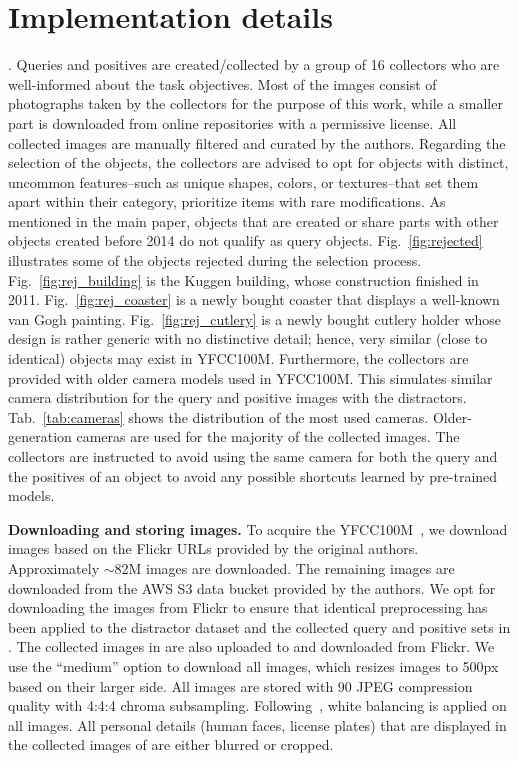 \appendix
\renewcommand{\thefigure}{\Alph{figure}}
\renewcommand{\thetable}{\Alph{table}}

\section{Implementation details}

\medskip{}. 
Queries and positives are created/collected by a group of 16 collectors who are well-informed about the task objectives. 
Most of the images consist of photographs taken by the collectors for the purpose of this work, while a smaller part is downloaded from online repositories with a permissive license.
All collected images are manually filtered and curated by the authors. Regarding the selection of the objects, the collectors are advised to opt for objects with distinct, uncommon features--such as unique shapes, colors, or textures--that set them apart within their category, \ie prioritize items with rare modifications. 
As mentioned in the main paper, objects that are created or share parts with other objects created before 2014 do not qualify as query objects. Fig.~\ref{fig:rejected} illustrates some of the objects rejected during the selection process. Fig.~\ref{fig:rej_building} is the Kuggen building, whose construction finished in 2011. Fig.~\ref{fig:rej_coaster} is a newly bought coaster that displays a well-known van Gogh painting. Fig.~\ref{fig:rej_cutlery} is a newly bought cutlery holder whose design is rather generic with no distinctive detail; hence, very similar (close to identical) objects may exist in YFCC100M. 
Furthermore, the collectors are provided with older camera models used in YFCC100M. This simulates similar camera distribution for the query and positive images with the distractors. Tab.~\ref{tab:cameras} shows the distribution of the most used cameras. Older-generation cameras are used for the majority of the collected images.
The collectors are instructed to avoid using the same camera for both the query and the positives of an object to avoid any possible shortcuts learned by pre-trained models.

\medskip\noindent\textbf{Downloading and storing images.}
To acquire the YFCC100M~\cite{tsf+16}, we download images based on the Flickr URLs provided by the original authors.
Approximately $\sim$82M images are downloaded. The remaining images are downloaded from the AWS S3 data bucket provided by the authors.
We opt for downloading the images from Flickr to ensure that identical preprocessing has been applied to the distractor dataset and the collected query and positive sets in \ours.
The collected images in \ours are also uploaded to and downloaded from Flickr. We use the ``medium'' option to download all images, which resizes images to 500px based on their larger side.
All images are stored with 90 JPEG compression quality with 4:4:4 chroma subsampling. Following~\cite{gonzalez09,ab19}, white balancing is applied on all images.
All personal details (\eg human faces, license plates) that are displayed in the collected images of \ours are either blurred or cropped.

